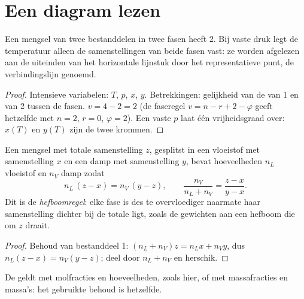 \section{Een diagram lezen}

\begin{proposition}\label{prop:b2:liquid-vapour-diagrams:variance}
Een mengsel van twee bestanddelen in twee fasen heeft  2. Bij vaste druk
legt de temperatuur alleen de samenstellingen van beide fasen vast: ze worden afgelezen
aan de uiteinden van het horizontale lijnstuk door het representatieve punt,
de verbindingslijn genoemd.
\end{proposition}

\begin{proof}
Intensieve variabelen: $T$, $p$, $x$, $y$. Betrekkingen: gelijkheid van de  van 1 en van 2 tussen de fasen. $v = 4 - 2 = 2$ (de faseregel
$v = n - r + 2 - \varphi$ geeft hetzelfde met $n = 2$, $r = 0$, $\varphi = 2$).
Een vaste $p$ laat één vrijheidsgraad over: $x(T)$ en $y(T)$ zijn de twee krommen.
\end{proof}

\begin{theorem}[Hefboomregel]\label{thm:b2:liquid-vapour-diagrams:lever}
Een mengsel met totale samenstelling $z$, gesplitst in een vloeistof met samenstelling $x$
en een damp met samenstelling $y$, bevat hoeveelheden $n_L$ vloeistof en $n_V$
damp zodat
\[
  n_L\,(z - x) = n_V\,(y - z), \qquad \frac{n_V}{n_L + n_V} = \frac{z - x}{y - x} .
\]
Dit is de \emph{hefboomregel}: elke fase is des te
overvloediger naarmate haar samenstelling dichter bij de totale ligt, zoals de gewichten aan
een hefboom die om $z$ draait.
\end{theorem}

\begin{proof}
Behoud van bestanddeel 1: $(n_L + n_V)z = n_Lx + n_Vy$, dus $n_L(z - x) =
n_V(y - z)$; deel door $n_L + n_V$ en herschik.
\end{proof}

De  geldt met molfracties en hoeveelheden, zoals hier, of met massafracties
en massa's: het gebruikte behoud is hetzelfde.


